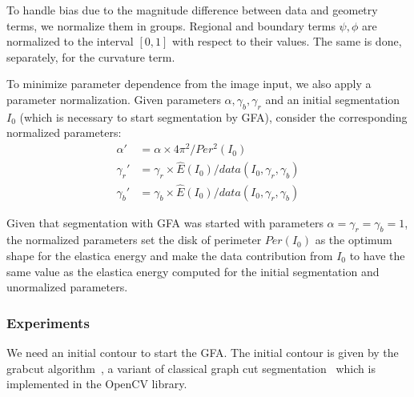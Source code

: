 \documentclass[review]{siamart220329}
\begin{document}
%
%
To handle bias due to the magnitude difference between data and geometry terms, we normalize them in groups. Regional and boundary terms $\psi,\phi$ are normalized to the interval $[0,1]$ with respect to their values. The same is done, separately, for the curvature term.

To minimize parameter dependence from the image input, we also apply a parameter normalization. Given parameters $\alpha, \gamma_b, \gamma_r$ and an initial segmentation $I_0$ (which is necessary to start segmentation by GFA), consider the corresponding normalized parameters:
%
%
\begin{align*}
    \alpha' & = \alpha \times 4\pi^2/Per^2(I_0) \\
	\gamma_r' & = \gamma_r \times \hat{E}(I_0)/data(I_0,\gamma_r,\gamma_b) \\	
	\gamma_b' & = \gamma_b \times \hat{E}(I_0)/data(I_0,\gamma_r,\gamma_b)		
\end{align*}

Given that segmentation with GFA was started with parameters $\alpha=\gamma_r=\gamma_b=1$, 
the normalized parameters set the disk of perimeter $Per(I_0)$ as the optimum shape 
for the elastica energy and make the data contribution from $I_0$ to have the same
value as the elastica energy computed for the initial segmentation and unormalized
parameters.
%
%
\subsubsection{Experiments}
We need an initial contour to start the GFA. The initial contour is given by the grabcut algorithm~\cite{rother04grabcut}, a variant of classical graph cut segmentation~\cite{boykov01graphcut} which is implemented in the OpenCV library.
\end{document}
